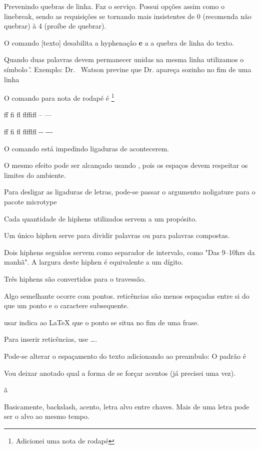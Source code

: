 \documentclass{article}
\begin{document}
Prevenindo quebras de linha.
\nolinebreak Faz o serviço.
Possui opções assim como o linebreak, sendo as requisições 
se tornando mais insistentes de 0 (recomenda não quebrar)
à 4 (proíbe de quebrar).

O comando \mbox[texto] desabilita a hyphenaçâo \textbf{e} a 
a quebra de linha do texto.

Quando duas palavras devem permanecer unidas na mesma linha utilizamos o símbolo \~.
Exemplo:
Dr. ~Watson previne que Dr. apareça sozinho no fim de uma linha

O comando para nota de rodapé é \footnote{Adicionei uma nota de rodapé}


ff fi fl flffifl -- ---

f\/f f\/i f\/l f\/l\/f\/f\/l\/f\/l -\/- -\/-\/-

O comando \/ está impedindo ligaduras de acontecerem.

O mesmo efeito pode ser alcançado usando {},
pois os espaços devem respeitar os limites do ambiente.

Para desligar as ligaduras de letras, pode-se passar o argumento noligature para o pacote microtype

Cada quantidade de hiphens utilizados servem a um propósito.

Um único hiphen serve para dividir palavras ou para palavras compostas.

Dois hiphens seguidos servem como separador de intervalo, como
"Das 9--10hrs da manhã".
A largura deste hiphen é equivalente a um dígito.

Três hiphens são convertidos para o travessão.

Algo semelhante ocorre com pontos.
reticências são menos espaçadas entre si do que um ponto 
e o caractere subsequente.

usar \@ indica ao LaTeX que o ponto se situa no fim de uma frase.

Para inserir reticências, use \ldots.

Pode-se alterar o espaçamento do texto adicionando ao preambulo:
\frenchspacing
O padrão é \nofrenchspacing

Vou deixar anotado qual a forma de se forçar acentos (já precisei uma vez).

\~{a}

Basicamente, backslash, acento, letra alvo entre chaves.
Mais de uma letra pode ser o alvo ao mesmo tempo.
\end{document}
